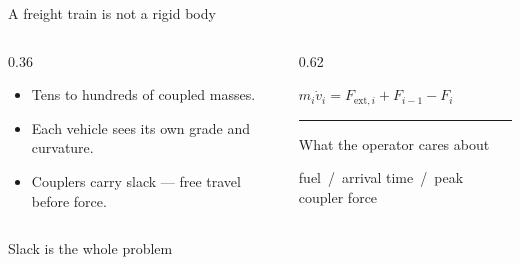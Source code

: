 \documentclass[aspectratio=169,11pt]{beamer}
\begin{document}
\begin{frame}{A freight train is not a rigid body}
  \begin{columns}[T,onlytextwidth]
    \begin{column}{0.36\textwidth}
      \begin{itemize}\setlength\itemsep{0.45em}
        \item Tens to hundreds of coupled masses.
        \item Each vehicle sees its \alert{own} grade and curvature.
        \item Couplers carry \alert{slack} --- free travel before force.
      \end{itemize}

    \end{column}
    \begin{column}{0.62\textwidth}
      \centering
      \vspace{0.2em}
      \scalebox{0.74}{\trainFBD}

      \vspace{1.2em}
      {\color{edSteel}\small $m_i\dot v_i = F_{\mathrm{ext},i} + F_{i-1} - F_i$\par}

      \vspace{1.6em}
      {\color{edSteel!45}\rule{0.85\linewidth}{0.5pt}}
      \vspace{0.5em}

      {\color{edSteel}\footnotesize What the operator cares about\par}
      \vspace{0.2em}
      {\color{edPaper}\small fuel \,\textcolor{edAmber}{/}\, arrival time
       \,\textcolor{edAmber}{/}\, peak coupler force\par}
    \end{column}
  \end{columns}
\end{frame}

\begin{frame}{Slack is the whole problem}
  \centering

  \vspace{0.15em}
\end{frame}
\end{document}
